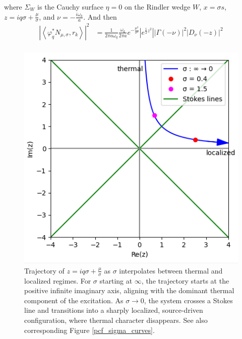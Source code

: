 \documentclass[12pt,a4paper]{article}
\begin{document}
where $\Sigma_W$ is the Cauchy surface $\eta=0$ on the Rindler wedge $W$,  $x = \sigma s$, $z = i q \sigma + \frac{\mu}{\sigma}$, and $\nu = -\frac{i \omega_k}{a}$. And then
\begin{equation}
  \begin{aligned}
    \left|\left< \varphi^*_q N_{\mu,\sigma}, r_k \right>\right|^2 &= \frac{1}{2\pi a \omega_q} \frac{\omega_k}{2\pi a} e^{-\frac{\mu^2}{\sigma^2}} \left| e^{\frac{1}{2} z^2} \right| \left| \Gamma(-\nu) \right|^2 \left| D_\nu(-z) \right|^2 \\
  \end{aligned}
\label{pcf}
\end{equation}
\begin{figure}[h]
\centering
\includegraphics[scale=0.5]{stokes.png}
\caption{Trajectory of $z = i q \sigma + \frac{\mu}{\sigma}$ as $\sigma$ interpolates between thermal and localized regimes. For $\sigma$ starting at $\infty$, the trajectory starts at the positive infinite imaginary axis, aligning with the dominant thermal component of the excitation. As $\sigma \to 0$, the system crosses a Stokes line and transitions into a sharply localized, source-driven configuration, where thermal character disappears. See also corresponding Figure \ref{pcf_sigma_curves}.}
\label{stokes}
\end{figure}
\end{document}
